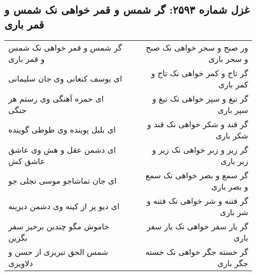 \begin{center}
\section*{غزل شماره ۲۵۹۳: گر شمس و قمر خواهی نک شمس و قمر باری}
\label{sec:2593}
\begin{longtable}{l p{0.5cm} r}
گر شمس و قمر خواهی نک شمس و قمر باری
&&
ور صبح و سحر خواهی نک صبح و سحر باری
\\
ای یوسف کنعانی وی جان سلیمانی
&&
گر تاج و کمر خواهی نک تاج و کمر باری
\\
ای حمزه آهنگی وی رستم هر جنگی
&&
گر تیغ و سپر خواهی نک تیغ و سپر باری
\\
ای بلبل پوینده وی طوطی گوینده
&&
گر قند و شکر خواهی نک قند و شکر باری
\\
ای دشمن عقل و هش وی عاشق عاشق کش
&&
گر زیر و زبر خواهی نک زیر و زبر باری
\\
ای جان تماشاجو موسی تجلی جو
&&
گر سمع و بصر خواهی نک سمع و بصر باری
\\
ای دیو پر از کینه وی دشمن دیرینه
&&
گر فتنه و شر خواهی نک فتنه و شر باری
\\
خاموش مگو چندین برخیز سفر بگزین
&&
گر یار سفر خواهی نک یار سفر باری
\\
شمس الحق تبریزی از حسن و دلاویزی
&&
گر خسته جگر خواهی نک خسته جگر باری
\\
\end{longtable}
\end{center}
